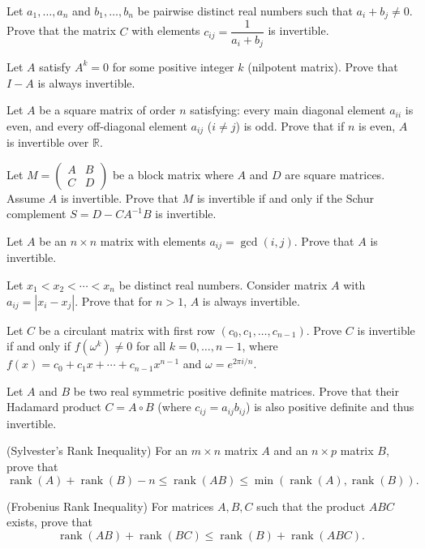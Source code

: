 \documentclass[12pt]{article}
\begin{document}
\begin{problems}
\item Let $a_1,\dots,a_n$ and $b_1,\dots,b_n$ be pairwise distinct real numbers such that $a_i+b_j\ne 0$. Prove that the matrix $C$ with elements $c_{ij}=\dfrac{1}{a_i+b_j}$ is invertible.

\item Let $A$ satisfy $A^k=0$ for some positive integer $k$ (nilpotent matrix). Prove that $I-A$ is always invertible.

\item Let $A$ be a square matrix of order $n$ satisfying: every main diagonal element $a_{ii}$ is even, and every off-diagonal element $a_{ij}$ ($i\ne j$) is odd. Prove that if $n$ is even, $A$ is invertible over $\mathbb{R}$.

\item Let $M=\begin{pmatrix}A & B\\ C & D\end{pmatrix}$ be a block matrix where $A$ and $D$ are square matrices. Assume $A$ is invertible. Prove that $M$ is invertible if and only if the Schur complement $S=D-CA^{-1}B$ is invertible.

\item Let $A$ be an $n\times n$ matrix with elements $a_{ij}=\gcd(i,j)$. Prove that $A$ is invertible.

\item Let $x_1<x_2<\cdots<x_n$ be distinct real numbers. Consider matrix $A$ with $a_{ij}=|x_i-x_j|$. Prove that for $n>1$, $A$ is always invertible.

\item Let $C$ be a circulant matrix with first row $(c_0,c_1,\dots,c_{n-1})$. Prove $C$ is invertible if and only if $f(\omega^k)\ne 0$ for all $k=0,\dots,n-1$, where $f(x)=c_0+c_1x+\cdots+c_{n-1}x^{n-1}$ and $\omega=e^{2\pi i/n}$.

\item Let $A$ and $B$ be two real symmetric positive definite matrices. Prove that their Hadamard product $C=A\circ B$ (where $c_{ij}=a_{ij}b_{ij}$) is also positive definite and thus invertible.

\item (Sylvester's Rank Inequality) For an $m\times n$ matrix $A$ and an $n\times p$ matrix $B$, prove that
\[
\operatorname{rank}(A)+\operatorname{rank}(B)-n \le \operatorname{rank}(AB) \le \min(\operatorname{rank}(A),\operatorname{rank}(B)).
\]

\item (Frobenius Rank Inequality) For matrices $A,B,C$ such that the product $ABC$ exists, prove that
\[
\operatorname{rank}(AB)+\operatorname{rank}(BC) \le \operatorname{rank}(B)+\operatorname{rank}(ABC).
\]


\end{problems}
\end{document}

